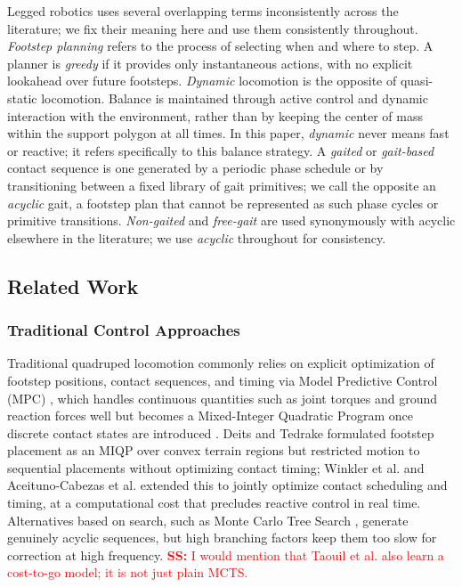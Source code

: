 Legged robotics uses several overlapping terms inconsistently across
the literature; we fix their meaning here and use them consistently
throughout. \textit{Footstep planning} refers to the process of
selecting when and where to step. A planner is \textit{greedy} if it
provides only instantaneous actions, with no explicit lookahead over
future footsteps. \textit{Dynamic} locomotion is the opposite of
quasi-static locomotion. Balance is maintained through active control
and dynamic interaction with the environment, rather than by keeping
the center of mass within the support polygon at all times. In this
paper, \textit{dynamic} never means fast or reactive; it refers
specifically to this balance strategy. A \textit{gaited} or
\textit{gait-based} contact sequence is one generated by a periodic
phase schedule or by transitioning between a fixed library of gait
primitives; we call the opposite an \textit{acyclic} gait, a footstep
plan that cannot be represented as such phase cycles or primitive
transitions. \textit{Non-gaited} and \textit{free-gait} are used
synonymously with acyclic elsewhere in the literature; we use
\textit{acyclic} throughout for consistency.

\subsection{Related Work}

\subsubsection{Traditional Control Approaches}
Traditional quadruped locomotion commonly relies on explicit
optimization of footstep positions, contact sequences, and timing via
Model Predictive Control (MPC) \cite{Kim2019highly-dynamic}, which
handles continuous quantities such as joint torques and ground
reaction forces well \cite{Wensing2022Nov} but becomes a
Mixed-Integer Quadratic Program once discrete contact states are
introduced \cite{Geisert2019contact-planning}. Deits and Tedrake
\cite{deits_footstep_2014} formulated footstep placement as an MIQP
over convex terrain regions but restricted motion to sequential
placements without optimizing contact timing; Winkler et al.
\cite{winkler_gait_2018} and Aceituno-Cabezas et al.
\cite{aceituno_simultaneous_2019} extended this to jointly optimize
contact scheduling and timing, at a computational cost that precludes
reactive control in real time. Alternatives based on search, such as
Monte Carlo Tree Search \cite{taouil_non-gaited_2024,
akizhanov_learning_2024}, generate genuinely acyclic sequences, but
high branching factors keep them too slow for correction at high
frequency.
\textcolor{red}{\textbf{SS:} I would mention that Taouil et al. also
learn a cost-to-go model; it is not just plain MCTS.}

